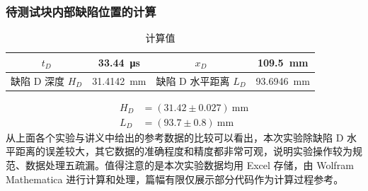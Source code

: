 \documentclass[a4paper,utf8]{article}
\begin{document}
        \subsubsection{待测试块内部缺陷位置的计算}
        \begin{table}[!ht]\caption{计算值}
            \centering\begin{tabular}{c c|c c}\hline
                $t_D$ & \SI{33.44}{\us} & $x_D$ & \SI{109.5}{\mm}\\ \hline
                缺陷 D 深度 $H_D$ & \SI{31.4142}{\mm} & 缺陷 D 水平距离 $L_D$ & \SI{93.6946}{\mm}  \\ \hline
            \end{tabular}
        \end{table}\par
            \begin{align*}
                H_D &= (31.42 \pm 0.027)~\unit{\mm}\\
                L_D &= (93.7 \pm 0.8) ~\unit{\mm}
            \end{align*}
        从上面各个实验与讲义中给出的参考数据的比较可以看出，本次实验除缺陷 D 水平距离的误差较大，其它数据的准确程度和精度都非常可观，说明实验操作较为规范、数据处理五疏漏。值得注意的是本次实验数据均用 Excel 存储，由 Wolfram Mathematica 进行计算和处理，篇幅有限仅展示部分代码作为计算过程参考。
        \begin{figure}[!ht]
            \\
        \end{figure}
\end{document}
